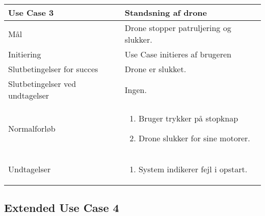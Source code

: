 \documentclass[Main]{subfiles}
\begin{document}
\begin{longtable}{|p{}|p{}|}
\hline
Use Case 3 	& 
Standsning af drone \\ \hline

Mål 		& 
Drone stopper patruljering og slukker. \\ \hline

Initiering	& 
Use Case initieres af brugeren \\ \hline

Slutbetingelser for succes & 
Drone er slukket.  \\ \hline

Slutbetingelser ved undtagelser & 
Ingen. \\ \hline

Normalforløb &	\vspace{-8mm}
	\begin{enumerate}[noitemsep,nolistsep,leftmargin=*]
	\item Bruger trykker på stopknap
	\item Drone slukker for sine motorer.
	\end{enumerate} \\ \hline

Undtagelser & \vspace{-8mm}
	\begin{enumerate}[noitemsep,nolistsep,leftmargin=*]
	\item System indikerer fejl i opstart.
	\end{enumerate} \\

\hline
\end{longtable}

	
	
\subsection{Extended Use Case 4}\label{UC:extend}
\end{document}
